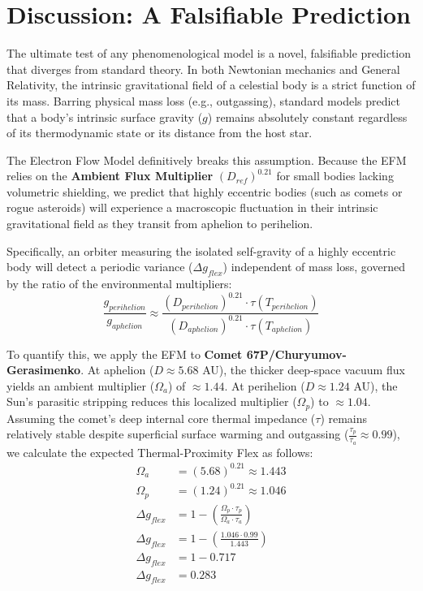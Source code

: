 \documentclass[11pt, a4paper]{article}
\begin{document}
\clearpage
\section{Discussion: A Falsifiable Prediction}

  The ultimate test of any phenomenological model is a novel, falsifiable prediction that diverges from standard theory. In both Newtonian mechanics and General Relativity, the intrinsic gravitational field of a celestial body is a strict function of its mass. Barring physical mass loss (e.g., outgassing), standard models predict that a body's intrinsic surface gravity ($g$) remains absolutely constant regardless of its thermodynamic state or its distance from the host star.

  The Electron Flow Model definitively breaks this assumption. Because the EFM relies on the \textbf{Ambient Flux Multiplier} $(D_{ref})^{0.21}$ for small bodies lacking volumetric shielding, we predict that highly eccentric bodies (such as comets or rogue asteroids) will experience a macroscopic fluctuation in their intrinsic gravitational field as they transit from aphelion to perihelion. 

  Specifically, an orbiter measuring the isolated self-gravity of a highly eccentric body will detect a periodic variance ($\Delta g_{flex}$) independent of mass loss, governed by the ratio of the environmental multipliers:
  $$\frac{g_{perihelion}}{g_{aphelion}} \approx \frac{(D_{perihelion})^{0.21} \cdot \tau(T_{perihelion})}{(D_{aphelion})^{0.21} \cdot \tau(T_{aphelion})}$$

  To quantify this, we apply the EFM to \textbf{Comet 67P/Churyumov-Gerasimenko}. At aphelion ($D \approx 5.68$ AU), the thicker deep-space vacuum flux yields an ambient multiplier ($\Omega_a$) of $\approx 1.44$. At perihelion ($D \approx 1.24$ AU), the Sun's parasitic stripping reduces this localized multiplier ($\Omega_p$) to $\approx 1.04$. Assuming the comet's deep internal core thermal impedance ($\tau$) remains relatively stable despite superficial surface warming and outgassing ($\frac{\tau_{p}}{\tau_{a}} \approx 0.99$), we calculate the expected Thermal-Proximity Flex as follows:
  \begin{align*}
    \Omega_{a} &= (5.68)^{0.21} \approx 1.443 \\
    \Omega_{p} &= (1.24)^{0.21} \approx 1.046 \\
    \Delta g_{flex} &= 1 - \left( \frac{\Omega_{p} \cdot \tau_{p}}{\Omega_{a} \cdot \tau_{a}} \right) \\
    \Delta g_{flex} &= 1 - \left( \frac{1.046 \cdot 0.99}{1.443} \right) \\
    \Delta g_{flex} &= 1 - 0.717 \\
    \Delta g_{flex} &= 0.283
  \end{align*}
\end{document}
